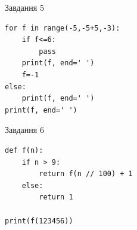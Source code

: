 \documentclass[12pt, ukrainian]{article}
\begin{document}
{\vspace{15mm}
\begin{minipage}[t]{9.7cm}                
{\begin{center}Завдання {5}\end{center}}
\begin{verbatim}
for f in range(-5,-5+5,-3):
    if f<=6:
        pass
    print(f, end=' ')
    f=-1
else:
    print(f, end=' ')
print(f, end=' ')
\end{verbatim}     
\end{minipage}
\vline \hspace{8mm}
\begin{minipage}[t]{8.0cm}                
{\begin{center}Завдання {6}\end{center}}
\begin{verbatim}
def f(n):
    if n > 9:
        return f(n // 100) + 1
    else:
        return 1

print(f(123456))
\end{verbatim}     
\end{minipage}

}
\newpage
\end{document}
